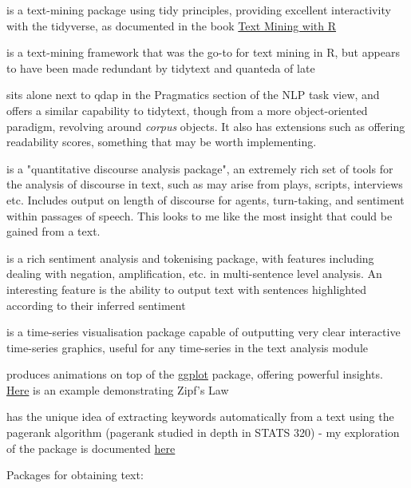 \documentclass[a4paper, 11pt]{article}
\begin{document}
\begin{description}
\item[{\href{https://github.com/juliasilge/tidytext}{tidytext}}] is a text-mining
package using tidy principles, providing excellent interactivity with
the tidyverse, as documented in the book
\href{https://www.tidytextmining.com}{Text Mining with R}
\item[{\href{http://tm.r-forge.r-project.org/}{tm}}] is a text-mining framework
that was the go-to for text mining in R, but appears to have been made
redundant by tidytext and quanteda of late
\item[{\href{https://quanteda.io/}{quanteda}}] sits alone next to qdap in the
Pragmatics section of the NLP task view, and offers a similar
capability to tidytext, though from a more object-oriented paradigm,
revolving around \emph{corpus} objects. It also has extensions such as
offering readability scores, something that may be worth implementing.
\item[{\href{https://trinker.github.io/qdap/vignettes/qdap\_vignette.html}{qdap}}] is a "quantitative discourse analysis package", an extremely rich set
of tools for the analysis of discourse in text, such as may arise from
plays, scripts, interviews etc. Includes output on length of discourse
for agents, turn-taking, and sentiment within passages of speech. This
looks to me like the most insight that could be gained from a text.
\item[{\href{https://github.com/trinker/sentimentr}{sentimentr}}] is a rich
sentiment analysis and tokenising package, with features including
dealing with negation, amplification, etc. in multi-sentence level
analysis. An interesting feature is the ability to output text with
sentences highlighted according to their inferred sentiment
\item[{\href{https://rstudio.github.io/dygraphs/}{dygraphs}}] is a time-series
visualisation package capable of outputting very clear interactive
time-series graphics, useful for any time-series in the text analysis
module
\item[{\href{https://github.com/thomasp85/gganimate}{gganimate}}] produces  animations on top of the \href{https://github.com/tidyverse/ggplot2}{ggplot} package, offering
powerful insights. \href{https://www.r-bloggers.com/investigating-words-distribution-with-r-zipfs-law-2/}{Here} is an example demonstrating Zipf's Law
\item[{\href{https://github.com/bnosac/textrank}{textrank}}] has the unique idea
of extracting keywords automatically from a text using the pagerank
algorithm (pagerank studied in depth in STATS 320) - my exploration of
the package is documented \href{./textrank\_exploration.Rmd}{here}
\item Packages for obtaining text:


\end{description}
\end{document}

